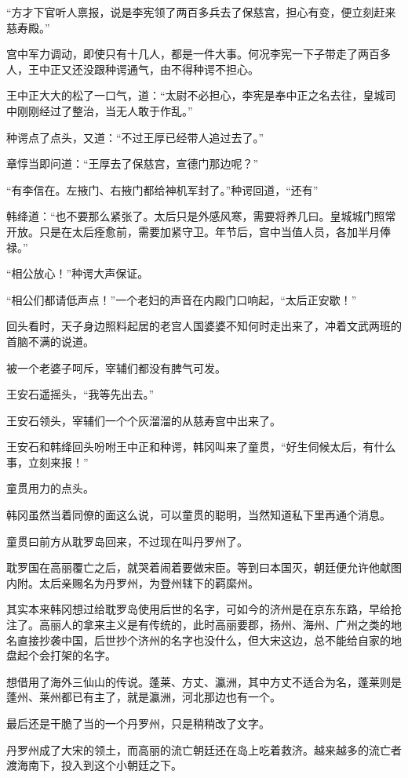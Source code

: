 “方才下官听人禀报，说是李宪领了两百多兵去了保慈宫，担心有变，便立刻赶来慈寿殿。”

宫中军力调动，即使只有十几人，都是一件大事。何况李宪一下子带走了两百多人，王中正又还没跟种谔通气，由不得种谔不担心。

王中正大大的松了一口气，道：“太尉不必担心，李宪是奉中正之名去往，皇城司中刚刚经过了整治，当无人敢于作乱。”

种谔点了点头，又道：“不过王厚已经带人追过去了。”

章惇当即问道：“王厚去了保慈宫，宣德门那边呢？”

“有李信在。左掖门、右掖门都给神机军封了。”种谔回道，“还有”

韩绛道：“也不要那么紧张了。太后只是外感风寒，需要将养几曰。皇城城门照常开放。只是在太后痊愈前，需要加紧守卫。年节后，宫中当值人员，各加半月俸禄。”

“相公放心！”种谔大声保证。

“相公们都请低声点！”一个老妇的声音在内殿门口响起，“太后正安歇！”

回头看时，天子身边照料起居的老宫人国婆婆不知何时走出来了，冲着文武两班的首脑不满的说道。

被一个老婆子呵斥，宰辅们都没有脾气可发。

王安石遥摇头，“我等先出去。”

王安石领头，宰辅们一个个灰溜溜的从慈寿宫中出来了。

王安石和韩绛回头吩咐王中正和种谔，韩冈叫来了童贯，“好生伺候太后，有什么事，立刻来报！”

童贯用力的点头。

韩冈虽然当着同僚的面这么说，可以童贯的聪明，当然知道私下里再通个消息。

童贯曰前方从耽罗岛回来，不过现在叫丹罗州了。

耽罗国在高丽覆亡之后，就哭着闹着要做宋臣。等到曰本国灭，朝廷便允许他献图内附。太后亲赐名为丹罗州，为登州辖下的羁縻州。

其实本来韩冈想过给耽罗岛使用后世的名字，可如今的济州是在京东东路，早给抢注了。高丽人的拿来主义是有传统的，此时高丽要郡，扬州、海州、广州之类的地名直接抄袭中国，后世抄个济州的名字也没什么，但大宋这边，总不能给自家的地盘起个会打架的名字。

想借用了海外三仙山的传说。蓬莱、方丈、瀛洲，其中方丈不适合为名，蓬莱则是蓬州、莱州都已有主了，就是瀛洲，河北那边也有一个。

最后还是干脆了当的一个丹罗州，只是稍稍改了文字。

丹罗州成了大宋的领土，而高丽的流亡朝廷还在岛上吃着救济。越来越多的流亡者渡海南下，投入到这个小朝廷之下。

